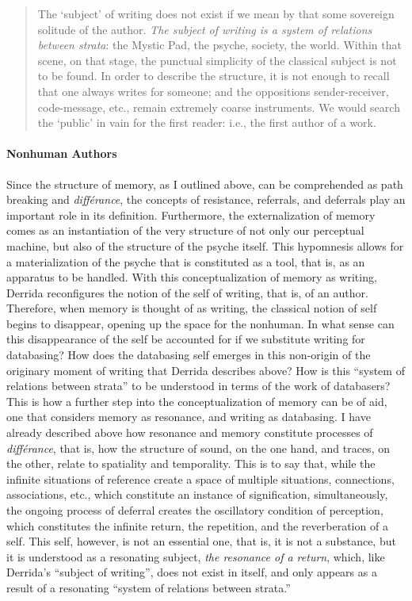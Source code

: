 \begin{quote}
	The `subject' of writing does not exist if we mean by that some sovereign solitude of the author. \textit{The subject of writing is a system of relations between strata}: the Mystic Pad, the psyche, society, the world. Within that scene, on that stage, the punctual simplicity of the classical subject is not to be found. In order to describe the structure, it is not enough to recall that one always writes for someone; and the oppositions sender-receiver, code-message, etc., remain extremely coarse instruments. We would search the `public' in vain for the first reader: i.e., the first author of a work. \im \parencite[227]{Der78:Wri}
\end{quote}

\paragraph{Nonhuman Authors}
Since the structure of memory, as I outlined above, can be comprehended as path breaking and \textit{différance}, the concepts of resistance, referrals, and deferrals play an important role in its definition. Furthermore, the externalization of memory comes as an instantiation of the very structure of not only our perceptual machine, but also of the structure of the psyche itself. This hypomnesis allows for a materialization of the psyche that is constituted as a tool, that is, as an apparatus to be handled. With this conceptualization of memory as writing, Derrida reconfigures the notion of the self of writing, that is, of an author. Therefore, when memory is thought of as writing, the classical notion of self begins to disappear, opening up the space for the nonhuman. In what sense can this disappearance of the self be accounted for if we substitute writing for databasing? How does the databasing self emerges in this non-origin of the originary moment of writing that Derrida describes above? How is this ``system of relations between strata'' to be understood in terms of the work of databasers? This is how a further step into the conceptualization of memory can be of aid, one that considers memory as resonance, and writing as databasing. I have already described above how resonance and memory constitute processes of \textit{différance}, that is, how the structure of sound, on the one hand, and traces, on the other, relate to spatiality and temporality. This is to say that, while the infinite situations of reference create a space of multiple situations, connections, associations, etc., which constitute an instance of signification, simultaneously, the ongoing process of deferral creates the oscillatory condition of perception, which constitutes the infinite return, the repetition, and the reverberation of a self. This self, however, is not an essential one, that is, it is not a substance, but it is understood as a resonating subject, \textit{the resonance of a return}, which, like Derrida's ``subject of writing'', does not exist in itself, and only appears as a result of a resonating ``system of relations between strata.'' 

